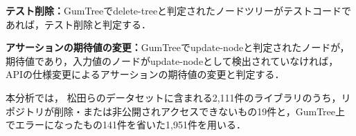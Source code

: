 \documentclass[T,J]{fose} %
\begin{document}
\noindent\textbf{テスト削除：}GumTreeでdelete-treeと判定されたノードツリーがテストコードであれば，テスト削除と判定する．

\noindent\textbf{アサーションの期待値の変更：}GumTreeでupdate-nodeと判定されたノードが，期待値であり，入力値のノードがupdate-nodeとして検出されていなければ，APIの仕様変更によるアサーションの期待値の変更と判定する．

本分析では，
松田らのデータセットに含まれる2,111件のライブラリのうち，リポジトリが削除・または非公開されアクセスできないもの19件と，GumTree上でエラーになったもの141件を省いた1,951件を用いる．


\end{document}
